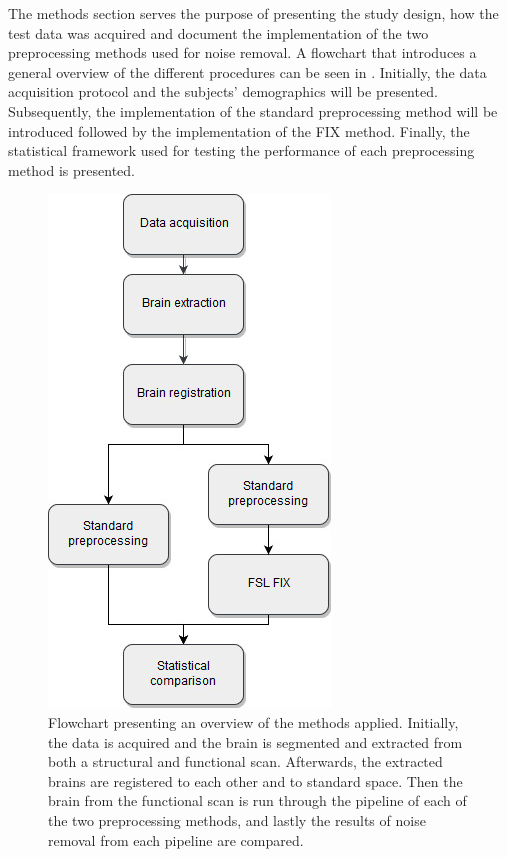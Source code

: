 
The methods section serves the purpose of presenting the study design, how the test data was acquired and document the implementation of the two preprocessing methods used for noise removal. A flowchart that introduces a general overview of the different procedures can be seen in . Initially, the data acquisition protocol and the subjects' demographics will be presented. Subsequently, the implementation of the standard preprocessing method will be introduced followed by the implementation of the FIX method. Finally, the statistical framework used for testing the performance of each preprocessing method is presented. 

\begin{figure}[H]                 
	\includegraphics[width=.37\textwidth]{figures/bMethods/Flowchart_intro}  
	\caption{Flowchart presenting an overview of the methods applied. Initially, the data is acquired and the brain is segmented and extracted from both a structural and functional scan. Afterwards, the extracted brains are registered to each other and to standard space. Then the brain from the functional scan is run through the pipeline of each of the two preprocessing methods, and lastly the results of noise removal from each pipeline are compared.}
	\label{fig:meth:overview} 
\end{figure}
 